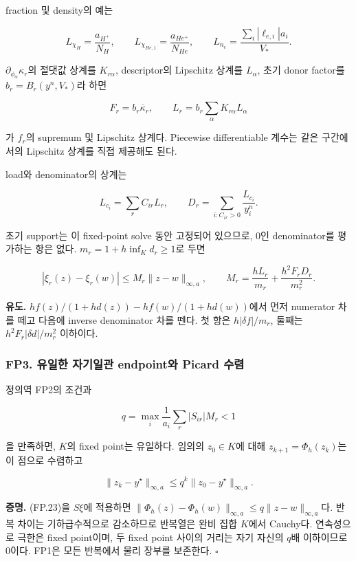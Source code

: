 fraction 및 density의 예는

\[
L_{\chi_H}=\frac{a_{H^+}}{N_H},\qquad
L_{\chi_{He,1}}=\frac{a_{He^+}}{N_{He}},\qquad
L_{n_e}=\frac{\sum_i|\ell_{e,i}|a_i}{V_*}.
\tag{FP.20}
\]

\(\partial_{\phi_\alpha}\kappa_r\)의 절댓값 상계를 \(K_{r\alpha}\), descriptor의 Lipschitz 상계를 \(L_\alpha\), 초기 donor factor를 \(b_r=B_r(y^n,V_*)\)라 하면

\[
F_r=b_r\overline\kappa_r,\qquad
L_r=b_r\sum_\alpha K_{r\alpha}L_\alpha
\tag{FP.21}
\]

가 \(f_r\)의 supremum 및 Lipschitz 상계다. Piecewise differentiable 계수는 같은 구간에서의 Lipschitz 상계를 직접 제공해도 된다.

load와 denominator의 상계는

\[
L_{c_i}=\sum_r C_{ir}L_r,\qquad
D_r=\sum_{i:C_{ir}>0}\frac{L_{c_i}}{y_i^n}.
\tag{FP.22}
\]

초기 support는 이 fixed-point solve 동안 고정되어 있으므로, 0인 denominator를 평가하는 항은 없다. \(m_r=1+h\inf_Kd_r\ge1\)로 두면

\[
|\xi_r(z)-\xi_r(w)|
\le
M_r\|z-w\|_{\infty,a},
\qquad
M_r=\frac{hL_r}{m_r}
+\frac{h^2F_rD_r}{m_r^2}.
\tag{FP.23}
\]

\textbf{유도.} \(h f(z)/(1+hd(z))-h f(w)/(1+hd(w))\)에서 먼저 numerator 차를 떼고 다음에 inverse denominator 차를 뗀다. 첫 항은 \(h|\delta f|/m_r\), 둘째는 \(h^2F_r|\delta d|/m_r^2\) 이하이다.

\hypertarget{fp3.-uxc720uxc77cuxd55c-uxc790uxae30uxc77cuxad00-endpointuxc640-picard-uxc218uxb834}{%
\subsubsection{FP3. 유일한 자기일관 endpoint와 Picard 수렴}\label{fp3.-uxc720uxc77cuxd55c-uxc790uxae30uxc77cuxad00-endpointuxc640-picard-uxc218uxb834}}

정의역 FP2의 조건과

\[
\boxed{
q=\max_i\frac1{a_i}\sum_r|S_{ir}|M_r<1
}
\tag{FP.24}
\]

을 만족하면, \(K\)의 fixed point는 유일하다. 임의의 \(z_0\in K\)에 대해 \(z_{k+1}=\Phi_h(z_k)\)는 이 점으로 수렴하고

\[
\|z_k-y^\star\|_{\infty,a}
\le q^k\|z_0-y^\star\|_{\infty,a}.
\tag{FP.25}
\]

\textbf{증명.} (FP.23)을 \(S\xi\)에 적용하면 \(\|\Phi_h(z)-\Phi_h(w)\|_{\infty,a}\le q\|z-w\|_{\infty,a}\)다. 반복 차이는 기하급수적으로 감소하므로 반복열은 완비 집합 \(K\)에서 Cauchy다. 연속성으로 극한은 fixed point이며, 두 fixed point 사이의 거리는 자기 자신의 \(q\)배 이하이므로 0이다. FP1은 모든 반복에서 물리 장부를 보존한다. \(\square\)

